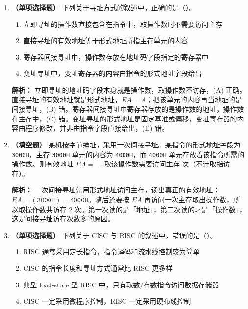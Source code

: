 \begin{enumerate}[leftmargin=*]
    \vspace{8pt}

    \item \textbf{（单项选择题）}
    下列关于寻址方式的叙述中，正确的是（\quad）。
    \begin{enumerate}[label=(\Alph*)]
        \item 立即寻址的操作数直接包含在指令中，取操作数时不需要访问主存
        \item 直接寻址的有效地址等于形式地址所指主存单元的内容
        \item 寄存器间接寻址中，操作数存放在地址码字段指定的寄存器中
        \item 变址寻址中，变址寄存器的内容由指令的形式地址字段给出
    \end{enumerate}

    \ifshowsolutions\par\noindent\textbf{解析：} 立即寻址的地址码字段本身就是操作数，取操作数不访存，(A) 正确。直接寻址的有效地址就是形式地址，$EA=A$；把该单元的内容再当地址的是间接寻址，(B) 错。寄存器间接寻址中寄存器存放的是操作数的地址，操作数在主存中，(C) 错。变址寻址的形式地址是固定基准或偏移，变址寄存器的内容由程序修改，并非由指令字段直接给出，(D) 错。\else \answerarea \fi

    \vspace{8pt}

    \item \textbf{（填空题）}
    某机按字节编址，采用一次间接寻址。某指令的形式地址字段为 \texttt{3000H}，主存 \texttt{3000H} 单元的内容为 \texttt{4000H}，而 \texttt{4000H} 单元存放着该指令所需的操作数。则有效地址 $EA=$ \underline{\hspace{2cm}}，取该操作数需要访问主存 \underline{\hspace{1cm}} 次（不计取指访存）。

    \ifshowsolutions\par\noindent\textbf{解析：} 一次间接寻址先用形式地址访问主存，读出真正的有效地址：$EA=(\texttt{3000H})=\texttt{4000H}$。随后还要按 $EA$ 再访问一次主存取出操作数，所以取操作数共访存 2 次。第一次读的是「地址」，第二次读的才是「操作数」，这是间接寻址访存次数多的原因。\else \answerarea \fi

    \vspace{8pt}

    \item \textbf{（单项选择题）}
    下列关于 CISC 与 RISC 的叙述中，错误的是（\quad）。
    \begin{enumerate}[label=(\Alph*)]
        \item RISC 通常采用定长指令，指令译码和流水线控制较为简单
        \item CISC 的指令长度和寻址方式通常比 RISC 更多样
        \item 典型 load-store 型 RISC 中，只有取数/存数指令访问数据存储器
        \item CISC 一定采用微程序控制，RISC 一定采用硬布线控制
    \end{enumerate}


\end{enumerate}
